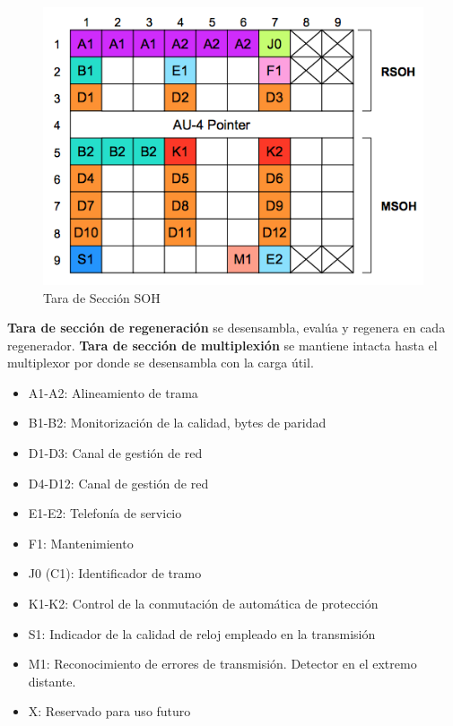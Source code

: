 \documentclass[10pt,portrait, twocolumn]{article}
\begin{document}
	\begin{figure}[!ht]
 		\centering
  		 \includegraphics[scale = 0.5]{images/SOH}
		\caption{Tara de Sección SOH}
	\end{figure}
	
\textbf{Tara de sección de regeneración} se desensambla, evalúa y regenera en cada regenerador. \textbf{Tara de sección de multiplexión} se mantiene intacta hasta el multiplexor por donde se desensambla con la carga útil.
	
	\begin{itemize}
		\item A1-A2: Alineamiento de trama
		\item B1-B2: Monitorización de la calidad, bytes de paridad
		\item D1-D3: Canal de gestión de red
		\item D4-D12: Canal de gestión de red
		\item E1-E2: Telefonía de servicio
		\item F1: Mantenimiento
		\item J0 (C1): Identificador de tramo
		\item K1-K2: Control de la conmutación de automática de protección
		\item S1: Indicador de la calidad de reloj empleado en la transmisión
		\item M1: Reconocimiento de errores de transmisión. Detector en el extremo distante.
		\item X: Reservado para uso futuro
	\end{itemize}
	
\end{document}
